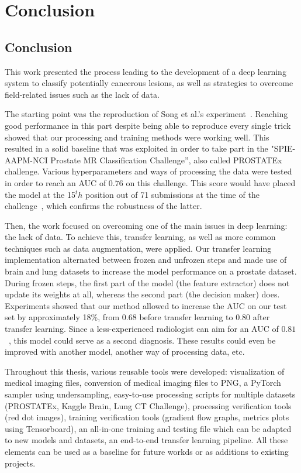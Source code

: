
\chapter{Conclusion}
\label{ch:conclusions}

\section{Conclusion}
\setlength{\marginparwidth}{3cm}\leavevmode {}This work presented the process leading to the development of a deep learning system to classify potentially cancerous lesions, as well as strategies to overcome field-related issues such as the lack of data.

The starting point was the reproduction of Song et al.'s experiment~\cite{07}. Reaching good performance in this part despite being able to reproduce every single trick showed that our processing and training methods were working well. This resulted in a solid baseline that was exploited in order to take part in the "SPIE-AAPM-NCI Prostate MR Classification Challenge”, also called PROSTATEx challenge. Various hyperparameters and ways of processing the data were tested in order to reach an AUC of $0.76$ on this challenge. This score would have placed the model at the 15$^th$ position out of 71 submissions at the time of the challenge~\cite{42}, which confirms the robustness of the latter.

Then, the work focused on overcoming one of the main issues in deep learning: the lack of data. To achieve this, transfer learning, as well as more common techniques such as data augmentation, were applied. Our transfer learning implementation alternated between frozen and unfrozen steps and made use of brain and lung datasets to increase the model performance on a prostate dataset. During frozen steps, the first part of the model (the feature extractor) does not update its weights at all, whereas the second part (the decision maker) does. Experiments showed that our method allowed to increase the AUC on our test set by approximately 18\%, from $0.68$ before transfer learning to $0.80$ after transfer learning. Since a less-experienced radiologist can aim for an AUC of $0.81$~\cite{42}, this model could serve as a second diagnosis. These results could even be improved with another model, another way of processing data, etc.

Throughout this thesis, various reusable tools were developed: visualization of medical imaging files, conversion of medical imaging files to PNG, a PyTorch sampler using undersampling, easy-to-use processing scripts for multiple datasets (PROSTATEx, Kaggle Brain, Lung CT Challenge), processing verification tools (red dot images), training verification tools (gradient flow graphs, metrics plots using Tensorboard), an all-in-one training and testing file which can be adapted to new models and datasets, an end-to-end transfer learning pipeline. All these elements can be used as a baseline for future workds or as additions to existing projects.


